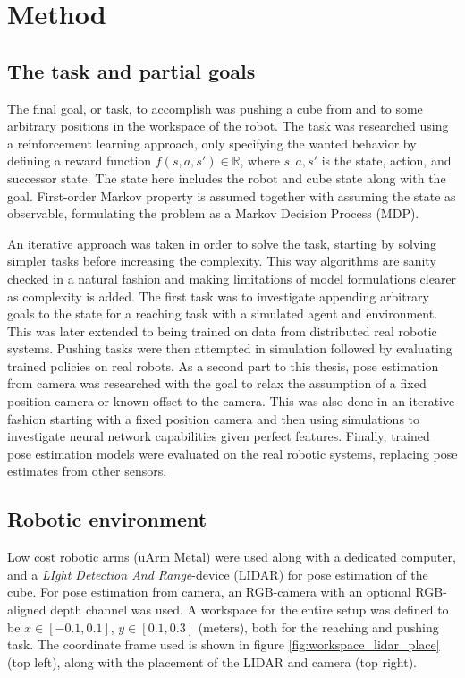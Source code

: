 \chapter{Method}

\section{The task and partial goals}

The final goal, or task, to accomplish was pushing a cube from and to some
arbitrary positions in the workspace of the robot. The task was researched
using a reinforcement learning approach, only specifying the wanted behavior by
defining a reward function $f(s, a, s') \in \mathbb{R}$, where $s, a, s'$ is
the state, action, and successor state. The state here includes the robot and
cube state along with the goal. First-order Markov property is assumed together
with assuming the state as observable, formulating the problem as a Markov
Decision Process (MDP).

An iterative approach was taken in order to solve the task, starting by solving
simpler tasks before increasing the complexity. This way algorithms are sanity
checked in a natural fashion and making limitations of model formulations
clearer as complexity is added. The first task was to investigate appending
arbitrary goals to the state for a reaching task with a simulated agent and
environment. This was later extended to being trained on data from distributed
real robotic systems. Pushing tasks were then attempted in simulation followed
by evaluating trained policies on real robots. As a second part to this thesis,
pose estimation from camera was researched with the goal to relax the
assumption of a fixed position camera or known offset to the camera. This was
also done in an iterative fashion starting with a fixed position camera and
then using simulations to investigate neural network capabilities given perfect
features. Finally, trained pose estimation models were evaluated on the real
robotic systems, replacing pose estimates from other sensors.

\section{Robotic environment}
\label{sec:robo_env}

Low cost robotic arms (uArm Metal) were used along with a dedicated computer,
and a \textit{LIght Detection And Range}-device (LIDAR) for pose estimation of
the cube. For pose estimation from camera, an RGB-camera with an optional
RGB-aligned depth channel was used. A workspace for the entire setup was
defined to be $x \in [-0.1, 0.1]$, $y \in [0.1, 0.3]$ (meters), both for the
reaching and pushing task. The coordinate frame used is shown in figure
\ref{fig:workspace_lidar_place} (top left), along with the placement of the
LIDAR and camera (top right).

